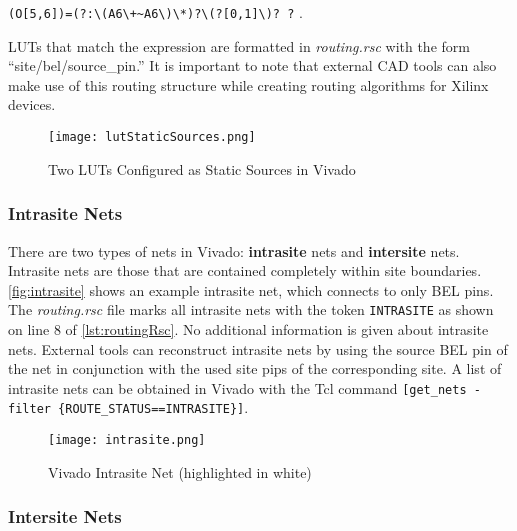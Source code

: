\begin{center}
\verb!(O[5,6])=(?:\(A6\+~A6\)\*)?\(?[0,1]\)? ?!
.
\end{center}

\noindent LUTs that match the expression are formatted in
\textit{routing.rsc} with the form ``site/bel/source\_pin.'' It is important to
note that external CAD tools can also make use of this routing structure while
creating routing algorithms for Xilinx devices.

\begin{figure}[t]
  \centering
  \texttt{[image: lutStaticSources.png]}
  \caption{Two LUTs Configured as Static Sources in Vivado}
  \label{fig:lutStaticSources2}
\end{figure}

\subsubsection{Intrasite Nets}

There are two types of nets in Vivado: \textbf{intrasite} nets and
\textbf{intersite} nets. Intrasite nets are those that are contained completely
within site boundaries. \autoref{fig:intrasite} shows an example intrasite net,
which connects to only BEL pins. The \textit{routing.rsc} file marks all
intrasite nets with the token \texttt{INTRASITE} as shown on line 8 of
\autoref{lst:routingRsc}. No additional information is given about
intrasite nets. External tools can reconstruct intrasite nets by using the
source BEL pin of the net in conjunction  with the used site pips of the
corresponding site. A list of intrasite nets can be obtained in Vivado with
the Tcl command \texttt{[get\_nets -filter \{ROUTE\_STATUS==INTRASITE\}]}.

\begin{figure}[b!]
  \centering
  \texttt{[image: intrasite.png]}
  \caption{Vivado Intrasite Net (highlighted in white)}
  \label{fig:intrasite}
\end{figure}

\subsubsection{Intersite Nets}

